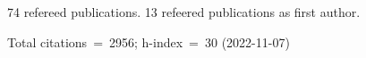 74 refereed publications. 13 refeered publications as first author.

Total citations~=~2956; h-index~=~30 (2022-11-07)